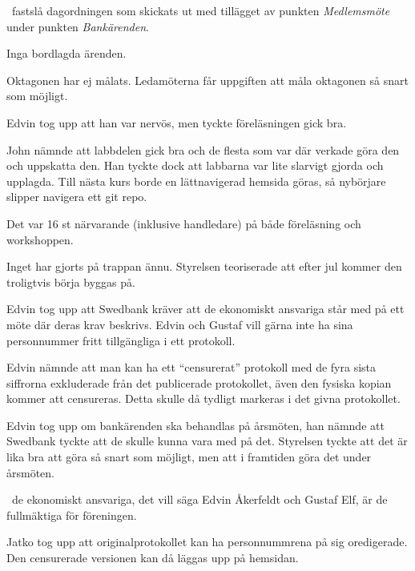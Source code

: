 \documentclass{protokoll}
\begin{document}
\newpage  
{}

\begin{beslut}
    \att~fastslå dagordningen som skickats ut med tillägget av punkten \textit{Medlemsmöte} under punkten \textit{Bankärenden}.
\end{beslut}

Inga bordlagda ärenden.

Oktagonen har ej målats. Ledamöterna får uppgiften att måla oktagonen så snart som möjligt.

Edvin tog upp att han var nervös, men tyckte föreläsningen gick bra.

John nämnde att labbdelen gick bra och de flesta som var där verkade göra den och uppskatta den. Han tyckte dock att labbarna var lite slarvigt gjorda och upplagda. Till nästa kurs borde en lättnavigerad hemsida göras, så nybörjare slipper navigera ett git repo.

Det var 16 st närvarande (inklusive handledare) på både föreläsning och workshoppen.

Inget har gjorts på trappan ännu. Styrelsen teoriserade att efter jul kommer den troligtvis börja byggas på.

Edvin tog upp att Swedbank kräver att de ekonomiskt ansvariga står med på ett möte där deras krav beskrivs. Edvin och Gustaf vill gärna inte ha sina personnummer fritt tillgängliga i ett protokoll.

Edvin nämnde att man kan ha ett ``censurerat'' protokoll med de fyra sista siffrorna exkluderade från det publicerade protokollet, även den fysiska kopian kommer att censureras. Detta skulle då tydligt markeras i det givna protokollet.

Edvin tog upp om bankärenden ska behandlas på årsmöten, han nämnde att Swedbank tyckte att de skulle kunna vara med på det. Styrelsen tyckte att det är lika bra att göra så snart som möjligt, men att i framtiden göra det under årsmöten.

\begin{beslut}
    \att~de ekonomiskt ansvariga, det vill säga Edvin Åkerfeldt och Gustaf Elf, är de fullmäktiga för föreningen.
\end{beslut}

Jatko tog upp att originalprotokollet kan ha personnummrena på sig oredigerade. Den censurerade versionen kan då läggas upp på hemsidan.
\end{document}
